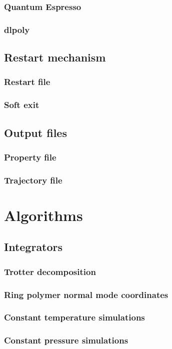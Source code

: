 \documentclass[12pt,fleqn]{report}
\begin{document}
\subsection{Quantum Espresso}
\subsection{dlpoly}
\section{Restart mechanism}
\subsection{Restart file}
\subsection{Soft exit}
\section{Output files}
\subsection{Property file}
\subsection{Trajectory file}

\chapter{Algorithms}
\section{Integrators}
\subsection{Trotter decomposition}
\subsection{Ring polymer normal mode coordinates}
\subsection{Constant temperature simulations}
\subsection{Constant pressure simulations}
\end{document}
